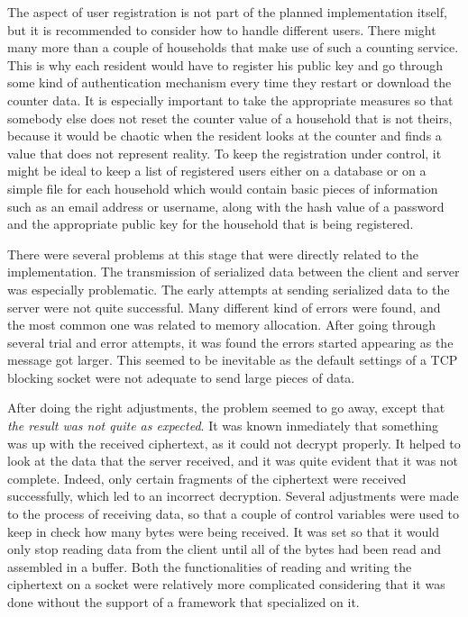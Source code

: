The aspect of user registration is not part of the planned implementation itself, but it is recommended to consider how to handle different users. There might many more than a couple of households that make use of such a counting service. This is why each resident would have to register his public key and go through some kind of authentication mechanism every time they restart or download the counter data. It is especially important to take the appropriate measures so that somebody else does not reset the counter value of a household that is not theirs, because it would be chaotic when the resident looks at the counter and finds a value that does not represent reality.
To keep the registration under control, it might be ideal to keep a list of registered users either on a database or on a simple file for each household which would contain basic pieces of information such as an email address or username, along with the hash value of a password and the appropriate public key for the household that is being registered.

There were several problems at this stage that were directly related to the implementation. The transmission of serialized data between the client and server was especially problematic. The early attempts at sending serialized data to the server were not quite successful. Many different kind of errors were found, and the most common one was related to memory allocation. After going through several trial and error attempts, it was found the errors started appearing as the message got larger. This seemed to be inevitable as the default settings of a TCP blocking socket were not adequate to send large pieces of data. 

After doing the right adjustments, the problem seemed to go away, except that \textit{the result was not quite as expected}. It was known inmediately that something was up with the received ciphertext, as it could not decrypt properly. It helped to look at the data that the server received, and it was quite evident that it was not complete. Indeed, only certain fragments of the ciphertext were received successfully, which led to an incorrect decryption. Several adjustments were made to the process of receiving data, so that a couple of control variables were used to keep in check how many bytes were being received. It was set so that it would only stop reading data from the client until all of the bytes had been read and assembled in a buffer. Both the functionalities of reading and writing the ciphertext on a socket were relatively more complicated considering that it was done without the support of a framework that specialized on it.

